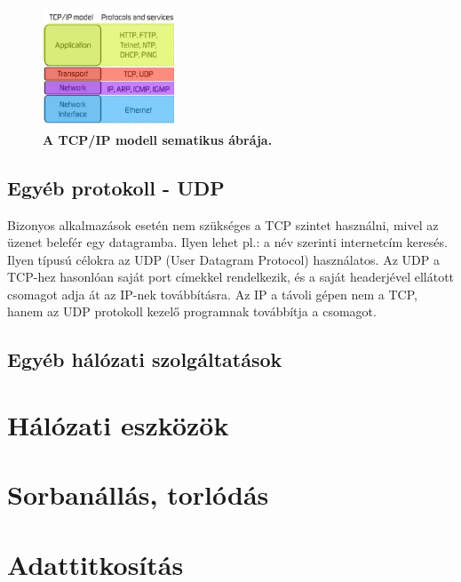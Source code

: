 \documentclass[12pt]{article}
\theoremstyle{plain}
\begin{document}
\begin{figure}[H]
    \begin{center}
    \includegraphics[width=0.35\textwidth]{media/tcpip.jpeg}
    \caption{\textbf{A TCP/IP modell sematikus ábrája.}} 
    \label{fig:tcpip}
    \end{center}
\end{figure}


\subsection {Egyéb protokoll - UDP}
Bizonyos alkalmazások esetén nem szükséges a TCP szintet használni, mivel az üzenet belefér egy datagramba. Ilyen lehet pl.: a név szerinti internetcím keresés. Ilyen típusú célokra az UDP (User Datagram Protocol) használatos. Az UDP a TCP-hez hasonlóan saját port címekkel rendelkezik, és a saját headerjével ellátott csomagot adja át az IP-nek továbbításra. Az IP a távoli gépen nem a TCP, hanem az UDP protokoll kezelő programnak továbbítja a csomagot.

\subsection{Egyéb hálózati szolgáltatások}

\section{Hálózati eszközök}

\section{Sorbanállás, torlódás}

\section{Adattitkosítás}










\end{document}
